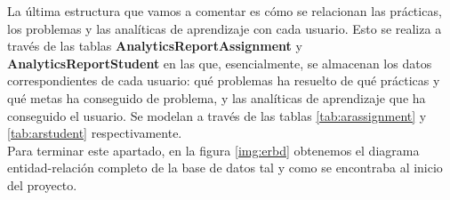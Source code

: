 La última estructura que vamos a comentar es cómo se relacionan las prácticas, los problemas y las analíticas de aprendizaje con cada usuario. Esto se realiza a través de las tablas \textbf{AnalyticsReportAssignment} y \textbf{AnalyticsReportStudent} en las que, esencialmente, se almacenan los datos correspondientes de cada usuario: qué problemas ha resuelto de qué prácticas y qué metas ha conseguido de problema, y las analíticas de aprendizaje que ha conseguido el usuario. Se modelan a través de las tablas \ref{tab:arassignment} y \ref{tab:arstudent} respectivamente.\\

Para terminar este apartado, en la figura \ref{img:erbd} obtenemos el diagrama entidad-relación completo de la base de datos tal y como se encontraba al inicio del proyecto.

